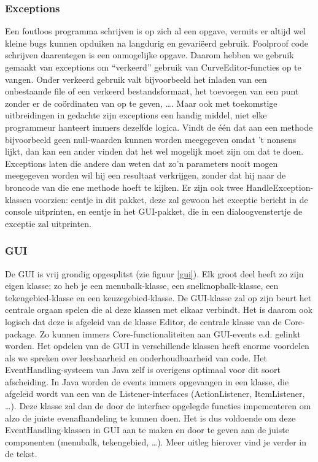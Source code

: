 \documentclass[a4paper,11pt,oneside, titlepage]{article}
\begin{document}
\subsubsection{Exceptions}
Een foutloos programma schrijven is op zich al een opgave, vermits er altijd wel kleine bugs
kunnen opduiken na langdurig en gevari\"eerd gebruik. Foolproof code schrijven daarentegen is een
onmogelijke opgave. Daarom hebben we gebruik gemaakt van exceptions om ``verkeerd'' gebruik van
CurveEditor-functies op te vangen. Onder verkeerd gebruik valt bijvoorbeeld het inladen van een
onbestaande file of een verkeerd bestandsformaat, het toevoegen van een punt zonder er de 
co\"ordinaten van op te geven, \ldots. Maar ook met toekomstige uitbreidingen in gedachte zijn exceptions een handig middel,
niet elke programmeur hanteert immers dezelfde logica. Vindt de \'e\'en dat aan een methode bijvoorbeeld geen null-waarden kunnen worden meegegeven omdat 't nonsens lijkt, dan kan een ander vinden dat het wel mogelijk moet zijn om dat te doen. Exceptions laten die andere dan weten dat zo'n parameters nooit mogen meegegeven worden wil hij een resultaat verkrijgen, zonder dat hij naar de broncode van die ene methode hoeft te kijken.\newline \newline
Er zijn ook twee HandleException-klassen voorzien: eentje in dit pakket, deze zal gewoon 
het exceptie bericht in de console uitprinten, en eentje in het GUI-pakket, die in een dialoogvenstertje de exceptie zal uitprinten.
\subsubsection{GUI}
De GUI is vrij grondig opgesplitst (zie figuur \ref{gui}). Elk groot deel heeft zo zijn eigen klasse; 
zo heb je een menubalk-klasse, een snelknopbalk-klasse, een tekengebied-klasse en een keuzegebied-klasse. \newline
De GUI-klasse zal op zijn beurt het centrale orgaan spelen die al deze klassen met elkaar verbindt.
Het is daarom ook logisch dat deze is afgeleid van de klasse Editor,
de centrale klasse van de Core-package. Zo kunnen immers Core-functionaliteiten aan GUI-events e.d. gelinkt worden.
\newline
Het opdelen van de GUI in verschillende klassen heeft enorme voordelen als we spreken 
over leesbaarheid en onderhoudbaarheid van code. Het EventHandling-systeem van Java zelf is overigens
optimaal voor dit soort afscheiding. In Java worden de events immers opgevangen in een klasse,
die afgeleid wordt van een van de Listener-interfaces (ActionListener, ItemListener, \ldots). Deze 
klasse zal dan de door de interface opgelegde functies impementeren om alzo de juiste evenafhandeling te kunnen
doen. Het is dus voldoende om deze EventHandling-klassen in GUI aan te maken en door te geven
aan de juiste componenten (menubalk, tekengebied, \ldots). Meer uitleg hierover vind je verder in
de tekst.
\end{document}
